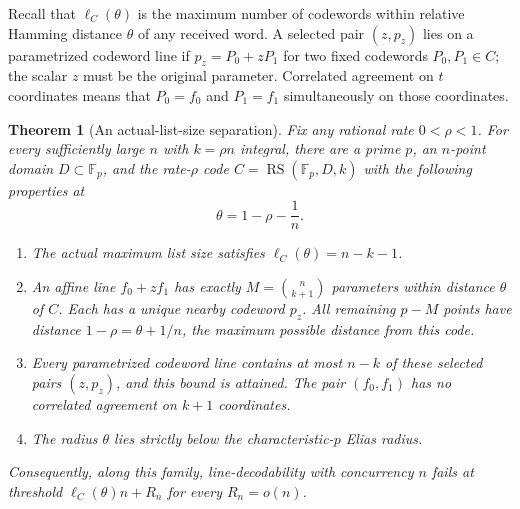 \documentclass[11pt,letterpaper]{article}
\newtheorem{theorem}{Theorem}[section]
\theoremstyle{definition}
\theoremstyle{remark}
\newcommand{\F}{\mathbb F}
\newcommand{\RS}{\operatorname{RS}}
\begin{document}
Recall that $\ell_C(\theta)$ is the maximum number of codewords within
relative Hamming distance $\theta$ of any received word. A selected pair
$(z,p_z)$ lies on a parametrized codeword line if
$p_z=P_0+zP_1$ for two fixed codewords $P_0,P_1\in C$; the scalar $z$
must be the original parameter. Correlated agreement on $t$ coordinates
means that $P_0=f_0$ and $P_1=f_1$ simultaneously on those coordinates.

\begin{theorem}[An actual-list-size separation]
\label{al:separation}
Fix any rational rate $0<\rho<1$. For every sufficiently large $n$
with $k=\rho n$ integral, there are a prime $p$, an
$n$-point domain $D\subset\F_p$, and the rate-$\rho$ code
$C=\RS(\F_p,D,k)$ with the following properties at
\[
 \theta=1-\rho-\frac1n.
\]
\begin{enumerate}[label=(\roman*)]
\item The actual maximum list size satisfies
$\ell_C(\theta)=n-k-1$.
\item An affine line $f_0+zf_1$ has exactly
$M=\binom n{k+1}$ parameters within distance $\theta$ of $C$.
Each has a unique nearby codeword $p_z$. All remaining $p-M$ points
have distance $1-\rho=\theta+1/n$, the maximum possible distance
from this code.
\item Every parametrized codeword line contains at most $n-k$ of these
selected pairs $(z,p_z)$, and this bound is attained. The pair
$(f_0,f_1)$ has no correlated agreement on $k+1$ coordinates.
\item The radius $\theta$ lies strictly below the characteristic-$p$
Elias radius.
\end{enumerate}
Consequently, along this family, line-decodability with concurrency $n$
fails at threshold $\ell_C(\theta)n+R_n$ for every $R_n=o(n)$.
\end{theorem}
\end{document}
